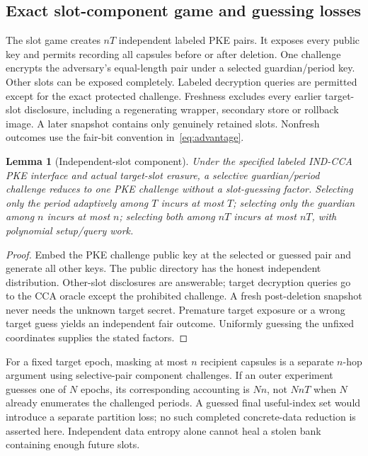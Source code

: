 \documentclass[pdflatex,sn-mathphys-num]{sn-jnl}
\theoremstyle{plain}
\newtheorem{lemma}[theorem]{Lemma}
\theoremstyle{definition}
\begin{document}
\subsection{Exact slot-component game and guessing losses}\label{sec:slots}
The slot game creates $nT$ independent labeled PKE pairs. It exposes every public key and permits recording all capsules before or after deletion. One challenge encrypts the adversary's equal-length pair under a selected guardian/period key. Other slots can be exposed completely. Labeled decryption queries are permitted except for the exact protected challenge. Freshness excludes every earlier target-slot disclosure, including a regenerating wrapper, secondary store or rollback image. A later snapshot contains only genuinely retained slots. Nonfresh outcomes use the fair-bit convention in~\eqref{eq:advantage}.

\begin{lemma}[Independent-slot component]\label{lem:slot}
Under the specified labeled IND-CCA PKE interface and actual target-slot erasure, a selective guardian/period challenge reduces to one PKE challenge without a slot-guessing factor. Selecting only the period adaptively among $T$ incurs at most $T$; selecting only the guardian among $n$ incurs at most $n$; selecting both among $nT$ incurs at most $nT$, with polynomial setup/query work.
\end{lemma}
\begin{proof}
Embed the PKE challenge public key at the selected or guessed pair and generate all other keys. The public directory has the honest independent distribution. Other-slot disclosures are answerable; target decryption queries go to the CCA oracle except the prohibited challenge. A fresh post-deletion snapshot never needs the unknown target secret. Premature target exposure or a wrong target guess yields an independent fair outcome. Uniformly guessing the unfixed coordinates supplies the stated factors.
\end{proof}

For a fixed target epoch, masking at most $n$ recipient capsules is a separate $n$-hop argument using selective-pair component challenges. If an outer experiment guesses one of $N$ epochs, its corresponding accounting is $Nn$, not $NnT$ when $N$ already enumerates the challenged periods. A guessed final useful-index set would introduce a separate partition loss; no such completed concrete-data reduction is asserted here. Independent data entropy alone cannot heal a stolen bank containing enough future slots.
\end{document}
